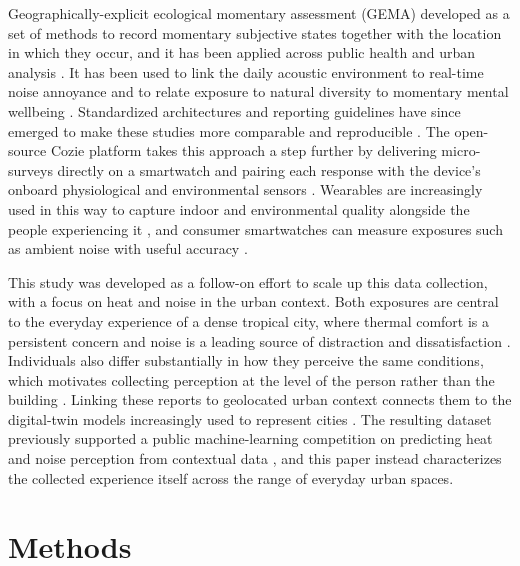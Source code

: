 \documentclass[]{interact}
\begin{document}
Geographically-explicit ecological momentary assessment (GEMA) developed as a set of methods to record momentary subjective states together with the location in which they occur, and it has been applied across public health and urban analysis \citep{Kirchner2016-dq}.
It has been used to link the daily acoustic environment to real-time noise annoyance \citep{Zhang2020-bq} and to relate exposure to natural diversity to momentary mental wellbeing \citep{Hammoud2024-pb}.
Standardized architectures and reporting guidelines have since emerged to make these studies more comparable and reproducible \citep{Gharani2021-hx,Kingsbury2024-qe}.
The open-source Cozie platform takes this approach a step further by delivering micro-surveys directly on a smartwatch and pairing each response with the device's onboard physiological and environmental sensors \citep{Tartarini2023-iu}.
Wearables are increasingly used in this way to capture indoor and environmental quality alongside the people experiencing it \citep{Abboushi2022-ot}, and consumer smartwatches can measure exposures such as ambient noise with useful accuracy \citep{Fischer2022-lv}.

This study was developed as a follow-on effort to scale up this data collection, with a focus on heat and noise in the urban context.
Both exposures are central to the everyday experience of a dense tropical city, where thermal comfort is a persistent concern and noise is a leading source of distraction and dissatisfaction \citep{Appel-Meulenbroek2020-bp}.
Individuals also differ substantially in how they perceive the same conditions, which motivates collecting perception at the level of the person rather than the building \citep{Wang2018-aj}.
Linking these reports to geolocated urban context connects them to the digital-twin models increasingly used to represent cities \citep{Miller2021-bm,Ignatius2024-ii}.
The resulting dataset previously supported a public machine-learning competition on predicting heat and noise perception from contextual data \citep{Miller2023-wi,Miller2025-qu}, and this paper instead characterizes the collected experience itself across the range of everyday urban spaces.


\section{Methods}\label{sec:methods}
\end{document}
